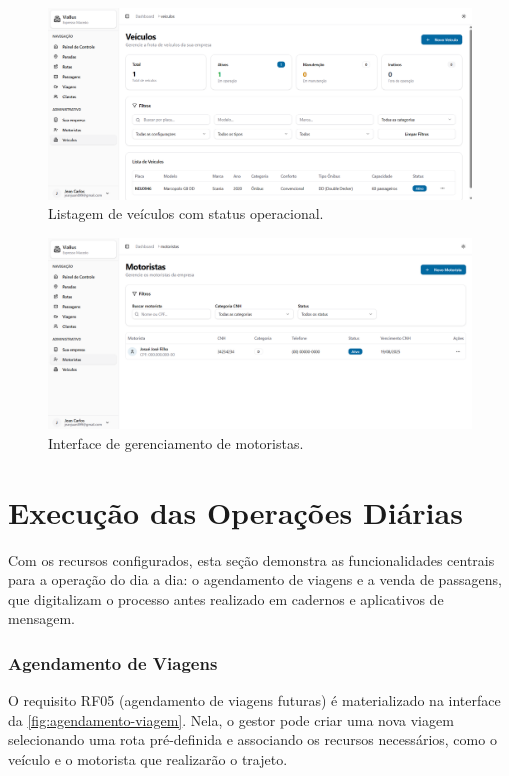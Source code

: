 \begin{figure}[H]
  \centering
  \includegraphics[width=1\textwidth]{imagens/veiculos.png}
  \caption{Listagem de veículos com status operacional.}
  \label{fig:veiculos}
\end{figure}

\begin{figure}[H]
  \centering
  \includegraphics[width=1\textwidth]{imagens/motoristas.png}
  \caption{Interface de gerenciamento de motoristas.}
  \label{fig:motoristas}
\end{figure}

\section{Execução das Operações Diárias}

Com os recursos configurados, esta seção demonstra as funcionalidades centrais para a operação do dia a dia: o agendamento de viagens e a venda de passagens, que digitalizam o processo antes realizado em cadernos e aplicativos de mensagem.

\subsubsection{Agendamento de Viagens}
O requisito RF05 (agendamento de viagens futuras) é materializado na interface da \autoref{fig:agendamento-viagem}. Nela, o gestor pode criar uma nova viagem selecionando uma rota pré-definida e associando os recursos necessários, como o veículo e o motorista que realizarão o trajeto.

